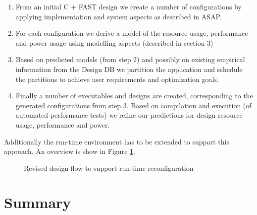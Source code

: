 \begin{enumerate}
\item From an initial C + FAST design we create a number of
  configurations by applying implementation and system aspects as
  described in ASAP.
\item For each configuration we derive a model of the resource usage,
  performance and power usage using modelling aspects (described in
  section 3)
\item Based on predicted models (from step 2) and possibly on existing
  empirical information from the Design DB we partition the
  application and schedule the partitions to achieve user requirements
  and optimization goals.
\item Finally a number of executables and designs are created,
  corresponding to the generated configurations from step 3. Based on
  compilation and execution (of automated performance tests) we refine
  our predictions for design resource usage, performance and power.
\end{enumerate}

Additionally the run-time environment has to be extended to support
this approach. An overview is show in Figure \ref{fig:reconfig-runtime}.

\begin{figure}[!ht]
  \centering
  \def\svgwidth{\textwidth}
  
  \caption{Revised design flow to support run-time reconfiguration}
  \label{fig:reconfig-runtime}
\end{figure}


\section{Summary}
